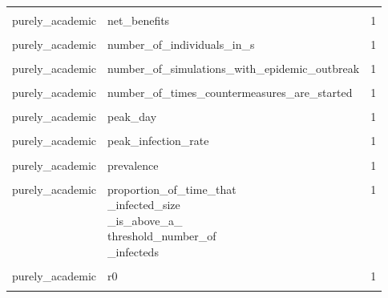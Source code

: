 \documentclass[
]{article}
\begin{document}
\begin{longtable}[t]{llr}
\cellcolor{gray!6}{purely\_academic} & \cellcolor{gray!6}{mortality\_rate} & \cellcolor{gray!6}{1}\\
purely\_academic & net\_benefits & 1\\
\addlinespace
\cellcolor{gray!6}{purely\_academic} & \cellcolor{gray!6}{number\_of\_exposed\_and\_infectious\_individuals} & \cellcolor{gray!6}{1}\\
purely\_academic & number\_of\_individuals\_in\_s & 1\\
\cellcolor{gray!6}{purely\_academic} & \cellcolor{gray!6}{number\_of\_latently\_infected\_individuals} & \cellcolor{gray!6}{1}\\
purely\_academic & number\_of\_simulations\_with\_epidemic\_outbreak & 1\\
\cellcolor{gray!6}{purely\_academic} & \cellcolor{gray!6}{number\_of\_susceptible\_individuals} & \cellcolor{gray!6}{1}\\
\addlinespace
purely\_academic & number\_of\_times\_countermeasures\_are\_started & 1\\
\cellcolor{gray!6}{purely\_academic} & \cellcolor{gray!6}{peak\_daily\_infection} & \cellcolor{gray!6}{1}\\
purely\_academic & peak\_day & 1\\
\cellcolor{gray!6}{purely\_academic} & \cellcolor{gray!6}{peak\_incidence} & \cellcolor{gray!6}{1}\\
purely\_academic & peak\_infection\_rate & 1\\
\addlinespace
\cellcolor{gray!6}{purely\_academic} & \cellcolor{gray!6}{peak\_infections} & \cellcolor{gray!6}{1}\\
purely\_academic & prevalence & 1\\
\cellcolor{gray!6}{purely\_academic} & \cellcolor{gray!6}{proportion\_of\_susceptible\_individuals} & \cellcolor{gray!6}{1}\\
purely\_academic & 
\makecell[l]{
	proportion\_of\_time\_that\\
	\_infected\_size\\
	\_is\_above\_a\_\\
	threshold\_number\_of\\
	\_infecteds
	} & 1\\
\cellcolor{gray!6}{purely\_academic} & \cellcolor{gray!6}{qualys} & \cellcolor{gray!6}{1}\\
\addlinespace
purely\_academic & r0 & 1\\
\cellcolor{gray!6}{purely\_academic} & \cellcolor{gray!6}{reproduction\_number} & \cellcolor{gray!6}{1}\\

\end{longtable}
\end{document}
